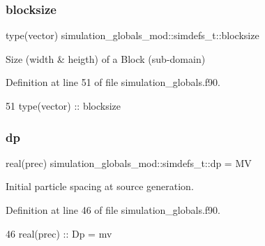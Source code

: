 \subsubsection{\texorpdfstring{blocksize}{blocksize}}
{\footnotesize\ttfamily type(vector) simulation\+\_\+globals\+\_\+mod\+::simdefs\+\_\+t\+::blocksize\hspace{0.3cm}{\ttfamily [private]}}



Size (width \& heigth) of a Block (sub-\/domain) 



Definition at line 51 of file simulation\+\_\+globals.\+f90.


\begin{DoxyCode}
51         \textcolor{keywordtype}{type}(vector)    ::  blocksize
\end{DoxyCode}
\mbox{\label{structsimulation__globals__mod_1_1simdefs__t_af730c363daf57cdb66206b7cc7e3d8ff}} 
\subsubsection{\texorpdfstring{dp}{dp}}
{\footnotesize\ttfamily real(prec) simulation\+\_\+globals\+\_\+mod\+::simdefs\+\_\+t\+::dp = MV\hspace{0.3cm}{\ttfamily [private]}}



Initial particle spacing at source generation. 



Definition at line 46 of file simulation\+\_\+globals.\+f90.


\begin{DoxyCode}
46         \textcolor{keywordtype}{real(prec)}      ::  Dp = mv         
\end{DoxyCode}
\mbox{\label{structsimulation__globals__mod_1_1simdefs__t_acc8df5cd09283215deb732d97b44f1dc}} 
